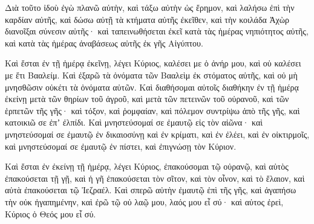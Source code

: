 {\par }{\PP {}Διὰ τοῦτο ἰδοὺ ἐγὼ πλανῶ αὐτὴν, καὶ τάξω αὐτὴν ὡς ἔρημον, καὶ λαλήσω ἐπὶ τὴν καρδίαν αὐτῆς,
καὶ δώσω αὐτῇ τὰ κτήματα αὐτῆς ἐκεῖθεν, καὶ τὴν κοιλάδα Ἀχὼρ διανοῖξαι σύνεσιν αὐτῆς· καὶ ταπεινωθήσεται ἐκεῖ κατὰ τὰς ἡμέρας νηπιότητος αὐτῆς, καὶ κατὰ τὰς ἡμέρας ἀναβάσεως αὐτῆς ἐκ γῆς Αἰγύπτου.
\par }{\PP {}Καὶ ἔσται ἐν τῇ ἡμέρᾳ ἐκεῖνῃ, λέγει Κύριος, καλέσει με ὁ ἀνήρ μου, καὶ οὐ καλέσει με ἔτι Βααλείμ.
Καὶ ἐξαρῶ τὰ ὀνόματα τῶν Βααλεὶμ ἐκ στόματος αὐτῆς, καὶ οὐ μὴ μνησθῶσιν οὐκέτι τὰ ὀνόματα αὐτῶν.
Καὶ διαθήσομαι αὐτοῖς διαθήκην ἐν τῇ ἡμέρᾳ ἐκείνῃ μετὰ τῶν θηρίων τοῦ ἀγροῦ, καὶ μετὰ τῶν πετεινῶν τοῦ οὐρανοῦ, καὶ τῶν ἑρπετῶν τῆς γῆς· καὶ τόξον, καὶ ῥομφαίαν, καὶ πόλεμον συντρίψω ἀπὸ τῆς γῆς, καὶ κατοικιῶ σε ἐπʼ ἐλπίδι.
Καὶ μνηστεύσομαί σε ἐμαυτῷ εἰς τὸν αἰῶνα· καὶ μνηστεύσομαί σε ἐμαυτῷ ἐν δικαιοσύνῃ καὶ ἐν κρίματι, καὶ ἐν ἐλέει, καὶ ἐν οἰκτιρμοῖς,
καὶ μνηστεύσομαί σε ἐμαυτῷ ἐν πίστει, καὶ ἐπιγνώσῃ τὸν Κύριον.
\par }{\PP {}Καὶ ἔσται ἐν ἐκείνῃ τῇ ἡμέρᾳ, λέγει Κύριος, ἐπακούσομαι τῷ οὐρανῷ, καὶ αὐτὸς ἐπακούσεται τῇ γῇ,
καὶ ἡ γῆ ἐπακούσεται τὸν σῖτον, καὶ τὸν οἶνον, καὶ τὸ ἔλαιον, καὶ αὐτὰ ἐπακούσεται τῷ Ἰεζραέλ.
Καὶ σπερῶ αὐτὴν ἐμαυτῷ ἐπὶ τῆς γῆς, καὶ ἀγαπήσω τὴν οὐκ ἠγαπημένην, καὶ ἐρῶ τῷ οὐ λαῷ μου, λαός μου εἶ σύ· καὶ αὐτος ἐρεὶ, Κύριος ὁ Θεός μου εἶ σύ.

\par }
